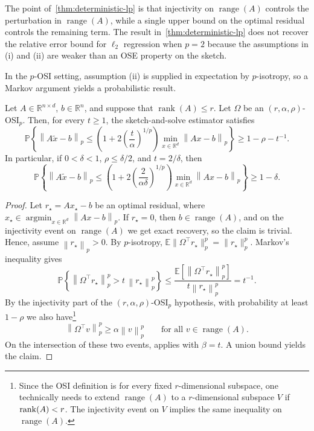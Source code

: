 \documentclass[onefignum,onetabnum]{siamart251216}
\newcommand{\R}{\mathbb{R}}
\newcommand{\E}{\mathbb{E}}
\newcommand{\Prob}{\mathbb{P}}
\newcommand{\norm}[1]{\left\lVert #1 \right\rVert}
\newcommand{\range}{\operatorname{range}}
\newcommand{\rank}{\operatorname{rank}}
\newcommand{\argmin}{\operatorname*{argmin}}
\begin{document}
The point of~\cref{thm:deterministic-lp} is that injectivity on $\range(A)$ controls the perturbation in $\range(A)$,  while a single upper bound on the optimal residual controls the remaining term.  The result in~\cref{thm:deterministic-lp} does not recover the relative error bound for $\ell_2$ regression when $p=2$ because the assumptions in (i) and (ii) are weaker than an OSE property on the sketch.  

In the $p$-OSI setting,  assumption (ii) is supplied in expectation by $p$-isotropy, so a Markov argument yields a probabilistic result. 

\begin{corollary}\label{cor:probabilistic-lp}
Let $A\in\R^{n\times d}$, $b\in\R^n$, and suppose that $\rank(A)\le r$. Let $\Omega$ be an $(r,\alpha,\rho)$-OSI${}_p$. Then, for every $t\ge1$,  the sketch-and-solve estimator satisfies
\[
\Prob\!\left\{ \norm{A\widetilde x-b}_p \le \left(1+2\left(\frac{t}{\alpha}\right)^{1/p}\right) \min_{x\in\R^d} \norm{Ax-b}_p \right\} \ge 1-\rho-t^{-1}.
\]
In particular, if $0<\delta<1$, $\rho\le \delta/2$, and $t=2/\delta$, then
\[
\Prob\!\left\{ \norm{A\widetilde x-b}_p \le \left(1+2\left(\frac{2}{\alpha\delta}\right)^{1/p}\right) \min_{x\in\R^d} \norm{Ax-b}_p \right\} \ge 1-\delta.
\]
\end{corollary}

\begin{proof}
Let $r_\star = Ax_\star-b$ be an optimal residual, where $x_\star\in \argmin_{x\in\R^d} \norm{Ax-b}_p$.  If $r_\star = 0$, then $b\in\range(A)$, and on the injectivity event on $\range(A)$ we get exact recovery, so the claim is trivial. Hence, assume $\norm{r_\star}_p>0$. By $p$-isotropy, $\E\|\Omega^\top r_\star\|_p^p = \|r_\star\|_p^p.$
Markov's inequality gives
\[
\Prob\!\left\{ \norm{\Omega^\top r_\star}_p^p > t\,\norm{r_\star}_p^p \right\}
\le
\frac{\E\left[\norm{\Omega^\top r_\star}_p^p\right]}{t\norm{r_\star}_p^p}
=
 t^{-1}.
\]
By the injectivity part of the $(r,\alpha,\rho)$-OSI${}_p$ hypothesis, with probability at least $1-\rho$ we also have\footnote{Since the OSI definition is for every fixed $r$-dimensional subspace,  one technically needs to extend $\range(A)$ to a $r$-dimensional subspace $V$ if ${\rm rank}(A)<r$.  The injectivity event on $V$ implies the same inequality on $\range(A)$.} 
\[
\norm{\Omega^\top v}_p^p \ge \alpha\norm{v}_p^p
\qquad \text{for all } v\in\range(A).
\]
On the intersection of these two events,  applies with $\beta=t$. A union bound yields the claim.
\end{proof}
\end{document}

